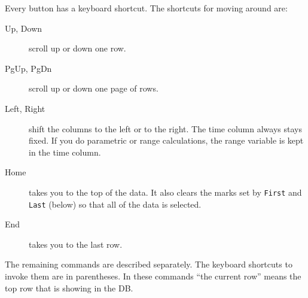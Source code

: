 \documentclass{article}
\begin{document}
Every button has a keyboard shortcut.  The shortcuts for moving around are:
\begin{description}
\item[Up, Down] scroll up or down one row.
\item[PgUp, PgDn] scroll up or down one page of rows.
\item[Left, Right] shift the columns to the left or to the right. The time column always stays fixed.
If you do parametric or range calculations, the range variable is kept in the time column.
\item[Home] takes you to the top of the data.  It also clears the marks set by {\tt First} and {\tt Last} (below)
so that all of the data is selected.
\item[End] takes you to the last row.
\end{description}
The remaining commands are described separately.  The keyboard
shortcuts to invoke them are in parentheses.  In these commands
``the current row'' means the top row that is showing in the DB.
\end{document}
